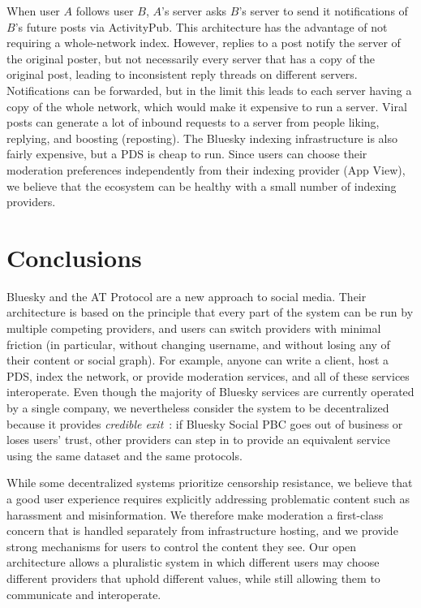 \documentclass[sigconf]{acmart}
\newif\ifextendedversion
\begin{document}
When user $A$ follows user $B$, $A$'s server asks $B$'s server to send it notifications of $B$'s future posts via ActivityPub.
This architecture has the advantage of not requiring a whole-network index.
However, replies to a post notify the server of the original poster, but not necessarily every server that has a copy of the original post, leading to inconsistent reply threads on different servers.
Notifications can be forwarded, but in the limit this leads to each server having a copy of the whole network, which would make it expensive to run a server.
Viral posts can generate a lot of inbound requests to a server from people liking, replying, and boosting (reposting).
The Bluesky indexing infrastructure is also fairly expensive, but a PDS is cheap to run.
Since users can choose their moderation preferences independently from their indexing provider (App View), we believe that the ecosystem can be healthy with a small number of indexing providers.

\fi %


\section{Conclusions}

Bluesky and the AT Protocol are a new approach to social media.
Their architecture is based on the principle that every part of the system can be run by multiple competing providers, and users can switch providers with minimal friction (in particular, without changing username, and without losing any of their content or social graph).
For example, anyone can write a client, host a PDS, index the network, or provide moderation services, and all of these services interoperate.
Even though the majority of Bluesky services are currently operated by a single company, we nevertheless consider the system to be decentralized because it provides \emph{credible exit}~\cite{NewboldProgress}: if Bluesky Social PBC goes out of business or loses users' trust, other providers can step in to provide an equivalent service using the same dataset and the same protocols.


While some decentralized systems prioritize censorship resistance, we believe that a good user experience requires explicitly addressing problematic content such as harassment and misinformation.
We therefore make moderation a first-class concern that is handled separately from infrastructure hosting, and we provide strong mechanisms for users to control the content they see.
Our open architecture allows a pluralistic system in which different users may choose different providers that uphold different values, while still allowing them to communicate and interoperate.
\end{document}
